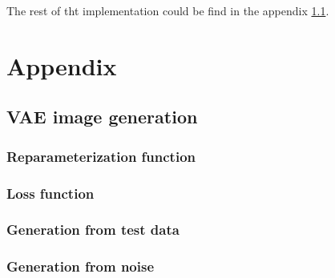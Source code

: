 \documentclass{article}
\begin{document}
The rest of tht implementation could be find in the appendix \ref{appendix:1.2}.

\newpage
\appendix

\section{Appendix}
\subsection{VAE image generation}\label{appendix:1.2}
\subsubsection{Reparameterization function}\label{appendix:1.2-reparam}

\subsubsection{Loss function}\label{appendix:1.2-loss}

\subsubsection{Generation from test data}\label{appendix:1.2-gen_test}

\subsubsection{Generation from noise}\label{appendix:1.2-gen}

\end{document}
